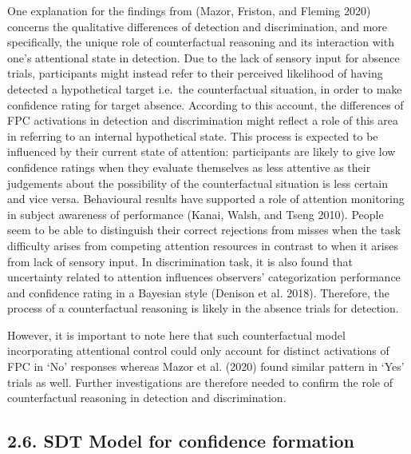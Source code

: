 \documentclass[]{article}
\begin{document}
One explanation for the findings from (Mazor, Friston, and Fleming 2020)
concerns the qualitative differences of detection and discrimination,
and more specifically, the unique role of counterfactual reasoning and
its interaction with one's attentional state in detection. Due to the
lack of sensory input for absence trials, participants might instead
refer to their perceived likelihood of having detected a hypothetical
target i.e.~the counterfactual situation, in order to make confidence
rating for target absence. According to this account, the differences of
FPC activations in detection and discrimination might reflect a role of
this area in referring to an internal hypothetical state. This process
is expected to be influenced by their current state of attention:
participants are likely to give low confidence ratings when they
evaluate themselves as less attentive as their judgements about the
possibility of the counterfactual situation is less certain and vice
versa. Behavioural results have supported a role of attention monitoring
in subject awareness of performance (Kanai, Walsh, and Tseng 2010).
People seem to be able to distinguish their correct rejections from
misses when the task difficulty arises from competing attention
resources in contrast to when it arises from lack of sensory input. In
discrimination task, it is also found that uncertainty related to
attention influences observers' categorization performance and
confidence rating in a Bayesian style (Denison et al. 2018). Therefore,
the process of a counterfactual reasoning is likely in the absence
trials for detection.

However, it is important to note here that such counterfactual model
incorporating attentional control could only account for distinct
activations of FPC in `No' responses whereas Mazor et al. (2020) found
similar pattern in `Yes' trials as well. Further investigations are
therefore needed to confirm the role of counterfactual reasoning in
detection and discrimination.

\hypertarget{sdt-model-for-confidence-formation}{%
\subsection{2.6. SDT Model for confidence
formation}\label{sdt-model-for-confidence-formation}}
\end{document}
